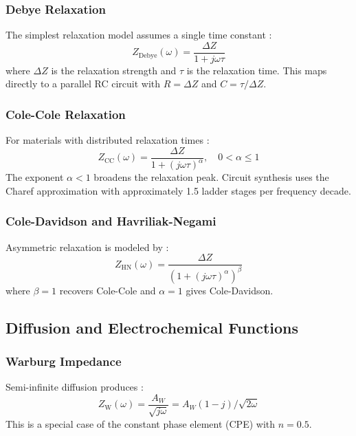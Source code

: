\documentclass{ieeeaccess}
\begin{document}
\subsubsection{Debye Relaxation}
The simplest relaxation model assumes a single time constant \cite{debye1929polar}:
\begin{equation}
Z_{\text{Debye}}(\omega) = \frac{\Delta Z}{1 + j\omega\tau}
\end{equation}
where $\Delta Z$ is the relaxation strength and $\tau$ is the relaxation time. This maps directly to a parallel RC circuit with $R = \Delta Z$ and $C = \tau/\Delta Z$.

\subsubsection{Cole-Cole Relaxation}
For materials with distributed relaxation times \cite{cole1941dispersion}:
\begin{equation}
Z_{\text{CC}}(\omega) = \frac{\Delta Z}{1 + (j\omega\tau)^\alpha}, \quad 0 < \alpha \leq 1
\end{equation}
The exponent $\alpha < 1$ broadens the relaxation peak. Circuit synthesis uses the Charef approximation \cite{charef1992fractal} with approximately 1.5 ladder stages per frequency decade.

\subsubsection{Cole-Davidson and Havriliak-Negami}
Asymmetric relaxation is modeled by \cite{davidson1951dielectric,havriliak1967complex}:
\begin{equation}
Z_{\text{HN}}(\omega) = \frac{\Delta Z}{(1 + (j\omega\tau)^\alpha)^\beta}
\end{equation}
where $\beta = 1$ recovers Cole-Cole and $\alpha = 1$ gives Cole-Davidson.

\subsection{Diffusion and Electrochemical Functions}

\subsubsection{Warburg Impedance}
Semi-infinite diffusion produces \cite{warburg1899ueber}:
\begin{equation}
Z_{\text{W}}(\omega) = \frac{A_W}{\sqrt{j\omega}} = A_W (1-j) / \sqrt{2\omega}
\end{equation}
This is a special case of the constant phase element (CPE) with $n = 0.5$.
\end{document}
